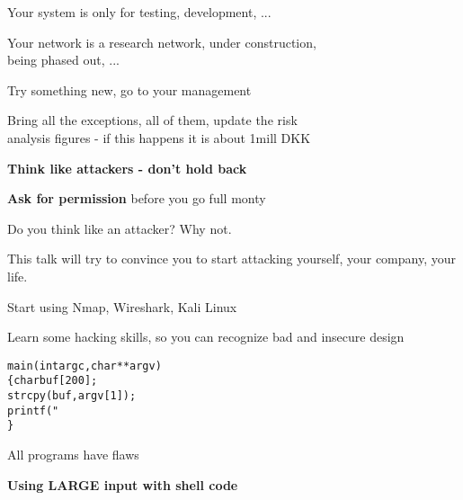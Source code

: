 \documentclass[Screen16to9,17pt,footrule]{foils}
\begin{document}


Your system is only for testing, development, ...

Your network is a research network, under construction, \\
being phased out, ...

Try something new, go to your management

Bring all the exceptions, all of them, update the risk \\
analysis figures - if this happens it is about 1mill DKK



{\bf Think like attackers - don't hold back}

\vskip 5mm
{\bf Ask for permission} before you go full monty



\vskip 2cm

\begin{center}

\bf\Large

Do you think like an attacker?
\vskip 5mm
Why not.
\end{center}

\begin{list2}
\item This talk will try to convince you to start attacking yourself, your company, your life.
\item Start using Nmap, Wireshark, Kali Linux
\item Learn some hacking skills, so you can recognize bad and insecure design
\end{list2}




\begin{alltt}
main(int argc, char **argv)
\{      char buf[200];
        strcpy(buf, argv[1]);
        printf("%s\textbackslash{}n",buf);
\}
\end{alltt}

\centerline{All programs have flaws}




\centerline{\bf\Large Using LARGE input with shell code}
\end{document}
